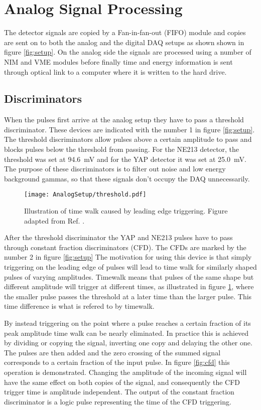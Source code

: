 \documentclass[main.tex]{subfiles}
\begin{document}
\section{Analog Signal Processing}
The detector signals are copied by a Fan-in-fan-out (FIFO) module and copies are sent on to both the analog and the digital DAQ setups as shown shown in figure \ref{fig:setup}. On the analog side the signals are processed using a number of NIM and VME modules before finally time and energy information is sent through optical link to a computer where it is written to the hard drive. 

\subsection{Discriminators}
When the pulses first arrive at the analog setup they have to pass a threshold discriminator. These devices are indicated with the number 1 in figure \ref{fig:setup}. The threshold discriminators allow pulses above a certain amplitude to pass and blocks pulses below the threshold from passing. For the NE213 detector, the threshold was set at \SI{94.6}{mV} and for the YAP detector it was set at \SI{25.0}{mV}. The purpose of these discriminators is to filter out noise and low energy background gammas, so that these signals don't occupy the DAQ unnecessarily.

\begin{figure}[h]
    \centering
        \texttt{[image: AnalogSetup/threshold.pdf]}
        \caption[Threshold discriminators and time walk]{Illustration of time walk caused by leading edge triggering. Figure adapted from Ref. \cite{rofors}.}
    \label{fig:discriminator}
\end{figure}

After the threshold discriminator the YAP and NE213 pulses have to pass through constant fraction discriminators (CFD). The CFDs are marked by the number 2 in figure \ref{fig:setup} The motivation for using this device is that simply triggering on the leading edge of pulses will lead to time walk for similarly shaped pulses of varying amplitudes. Timewalk means that pulses of the same shape but different amplitude will trigger at different times, as illustrated in figure \ref{fig:discriminator}, where the smaller pulse passes the threshold at a later time than the larger pulse. This time difference is what is refered to by timewalk. 

By instead triggering on the point where a pulse reaches a certain fraction of its peak amplitude time walk can be nearly eliminated\citep[pg.327]{Leo}. In practice this is achieved by dividing or copying the signal, inverting one copy and delaying the other one. The pulses are then added and the zero crossing of the summed signal corresponds to a certain fraction of the input pulse. In figure \ref{fig:cfd} this operation is demonstrated. Changing the amplitude of the incoming signal will have the same effect on both copies of the signal, and consequently the CFD trigger time is amplitude independent. The output of the constant fraction discriminator is a logic pulse representing the time of the CFD triggering.
\end{document}
